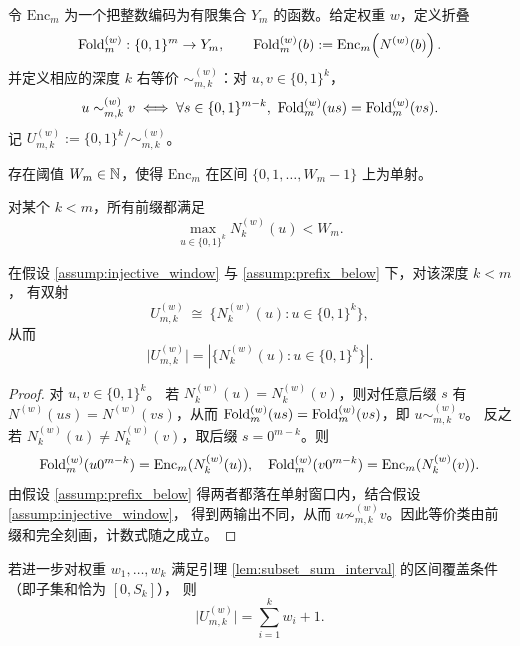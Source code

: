 \begin{definition}[截断折叠的一般形式]
令 $\mathrm{Enc}_m$ 为一个把整数编码为有限集合 $Y_m$ 的函数。给定权重 $w$，定义折叠
\[
\mathrm{Fold}^{(w)}_m:\{0,1\}^m\to Y_m,\qquad \mathrm{Fold}^{(w)}_m(b):=\mathrm{Enc}_m\!\left(N^{(w)}(b)\right).
\]
并定义相应的深度 $k$ 右等价 $\sim^{(w)}_{m,k}$：对 $u,v\in\{0,1\}^k$，
\[
u\sim^{(w)}_{m,k} v\iff \forall s\in\{0,1\}^{m-k},\ \mathrm{Fold}^{(w)}_m(us)=\mathrm{Fold}^{(w)}_m(vs).
\]
记 $U^{(w)}_{m,k}:=\{0,1\}^k/\!\sim^{(w)}_{m,k}$。
\end{definition}

\begin{assumption}[前缀区分的注入窗口]\label{assump:injective_window}
存在阈值 $W_m\in\mathbb{N}$，使得 $\mathrm{Enc}_m$ 在区间 $\{0,1,\dots,W_m-1\}$ 上为单射。
\end{assumption}

\begin{assumption}[前缀和严格低于阈值]\label{assump:prefix_below}
对某个 $k<m$，所有前缀都满足
\[
\max_{u\in\{0,1\}^k} N^{(w)}_k(u) < W_m.
\]
\end{assumption}

\begin{theorem}\label{thm:general_prefix_sum_classes}
在假设 \ref{assump:injective_window} 与 \ref{assump:prefix_below} 下，对该深度 $k<m$，
有双射
\[
U^{(w)}_{m,k}\ \cong\ \bigl\{N^{(w)}_k(u):u\in\{0,1\}^k\bigr\},
\]
从而
\[
\bigl|U^{(w)}_{m,k}\bigr|=\left|\bigl\{N^{(w)}_k(u):u\in\{0,1\}^k\bigr\}\right|.
\]
\end{theorem}
\begin{proof}
对 $u,v\in\{0,1\}^k$。
若 $N^{(w)}_k(u)=N^{(w)}_k(v)$，则对任意后缀 $s$ 有 $N^{(w)}(us)=N^{(w)}(vs)$，从而
$\mathrm{Fold}^{(w)}_m(us)=\mathrm{Fold}^{(w)}_m(vs)$，即 $u\sim^{(w)}_{m,k}v$。
反之若 $N^{(w)}_k(u)\ne N^{(w)}_k(v)$，取后缀 $s=0^{m-k}$。则
\[
\mathrm{Fold}^{(w)}_m(u0^{m-k})=\mathrm{Enc}_m(N^{(w)}_k(u)),\quad
\mathrm{Fold}^{(w)}_m(v0^{m-k})=\mathrm{Enc}_m(N^{(w)}_k(v)).
\]
由假设 \ref{assump:prefix_below} 得两者都落在单射窗口内，结合假设 \ref{assump:injective_window}，
得到两输出不同，从而 $u\not\sim^{(w)}_{m,k}v$。因此等价类由前缀和完全刻画，计数式随之成立。
\end{proof}

\begin{corollary}[区间覆盖条件下的闭式计数]\label{cor:general_interval_count}
若进一步对权重 $w_1,\dots,w_k$ 满足引理 \ref{lem:subset_sum_interval} 的区间覆盖条件（即子集和恰为 $[0,S_k]$），
则
\[
\bigl|U^{(w)}_{m,k}\bigr|=\sum_{i=1}^{k} w_i+1.
\]
\end{corollary}

